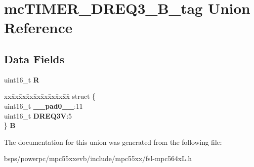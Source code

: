 \hypertarget{unionmcTIMER__DREQ3__16B__tag}{}\section{mc\+T\+I\+M\+E\+R\+\_\+\+D\+R\+E\+Q3\+\_\+B\+\_\+tag Union Reference}
\label{unionmcTIMER__DREQ3__16B__tag}
\subsection*{Data Fields}
\begin{DoxyCompactItemize}
\item 
\mbox{\label{unionmcTIMER__DREQ3__16B__tag_ada8e57f91697e7f10785bb30606d5429}} 
uint16\+\_\+t {\bfseries R}
\item 
\mbox{\label{unionmcTIMER__DREQ3__16B__tag_adc603894a5a23d179d89bbfb02b7b229}} 
\begin{tabbing}
xx\=xx\=xx\=xx\=xx\=xx\=xx\=xx\=xx\=\kill
struct \{\\
\>uint16\_t {\bfseries \_\_pad0\_\_}:11\\
\>uint16\_t {\bfseries DREQ3V}:5\\
\} {\bfseries B}\\

\end{tabbing}\end{DoxyCompactItemize}


The documentation for this union was generated from the following file\+:\begin{DoxyCompactItemize}
\item 
bsps/powerpc/mpc55xxevb/include/mpc55xx/fsl-\/mpc564x\+L.\+h\end{DoxyCompactItemize}

